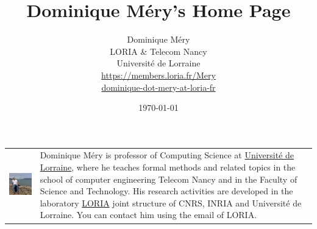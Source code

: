 \documentclass[ 12pt]{article}
\title{Dominique Méry's Home Page}
\author{Dominique M\'ery\\
LORIA \& Telecom Nancy\\ Universit\'e de Lorraine\\
\url{https://members.loria.fr/Mery}\\ \url{dominique-dot-mery-at-loria-fr}}
\date{\today}
\begin{document}
  \setcounter{ex}{1}
\maketitle





\noindent
\begin{tabular}{ll}
  \includegraphics{./images/merysf.jpg}  &
                                           \begin{minipage}{0.5\linewidth}
                                             Dominique Méry is  professor of Computing Science at  \href{https://www.univ-lorraine.fr}{Université  de 
Lorraine}, where he teaches     formal methods and related topics    in the school of computer engineering 
Telecom Nancy and in the Faculty of Science and Technology.  His 
research activities are developed in the laboratory  \href{https://ww.loria.fr}{LORIA} joint 
structure  of CNRS, INRIA and  Université de Lorraine.  You can 
contact him  using the email of LORIA.
\end{minipage}
\end{tabular}
\end{document}
